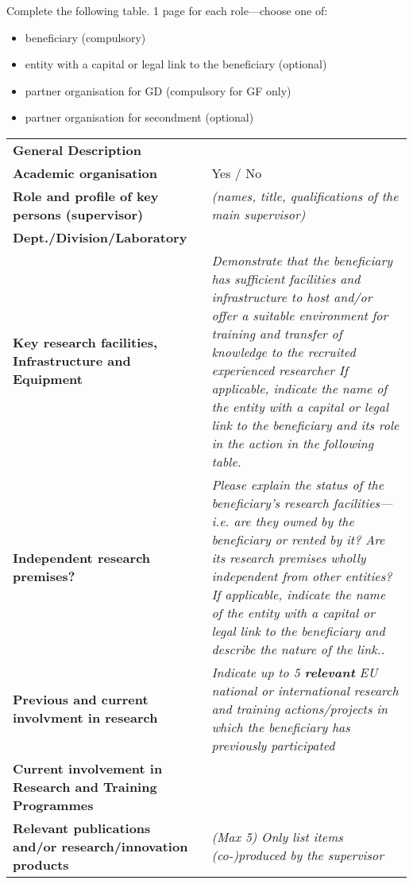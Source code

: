 \noindent Complete the following table. 1 page for each
role---choose one of:
\begin{itemize}
  \item beneficiary (compulsory)
  \item entity with a capital or legal link to the beneficiary (optional)
  \item partner organisation for GD (compulsory for GF only)
  \item partner organisation for secondment (optional)

\end{itemize}
\begin{table}[h!]
{\fontsize{9bp}{1em}\selectfont %
\noindent\begin{tabular}{|>{\raggedright}p{}|p{}|}\hline
  \multicolumn{2}{|c|}{\cellcolor{gray!50}
    \textbf{[Full name + Legal Entity Short Name + Country]}
  } \\\hline
\textbf{General Description} &

\\\hline
\textbf{Academic organisation} &
  Yes / No

\\\hline
\textbf{Role and profile of key persons (supervisor)} &
{\em (names, title, qualifications of the main supervisor)}
{\em }
\\\hline
\textbf{Dept./Division/Laboratory} &

\\\hline
\textbf{Key research facilities, Infrastructure and Equipment} &
{\em
Demonstrate that the beneficiary has sufficient facilities and
infrastructure to host and/or offer a suitable environment for
training and transfer of knowledge to the recruited experienced
researcher If applicable, indicate the name of the entity with a
capital or legal link to the beneficiary and its role in the
action in the following table.
}
\\\hline
\textbf{Independent research premises?} &
{\em Please explain the status of the beneficiary's research
facilities\----i.e. are they owned by the beneficiary or rented by
it? Are its research premises wholly independent from other
entities? If applicable, indicate the name of the entity with a
capital or legal link to the beneficiary and describe the nature
of the link..} 
\\\hline
\textbf{Previous and current involvment in research} &
{\em Indicate up to 5 \textbf{relevant} EU national or
international research and training actions/projects in which the
beneficiary has previously participated} \\\hline
\textbf{Current involvement in Research and Training Programmes} &
\\\hline
\textbf{Relevant publications and/or research/innovation products} &
{\em (Max 5) Only list items (co-)produced by the supervisor}
\\\hline
\end{tabular}}
\end{table}


